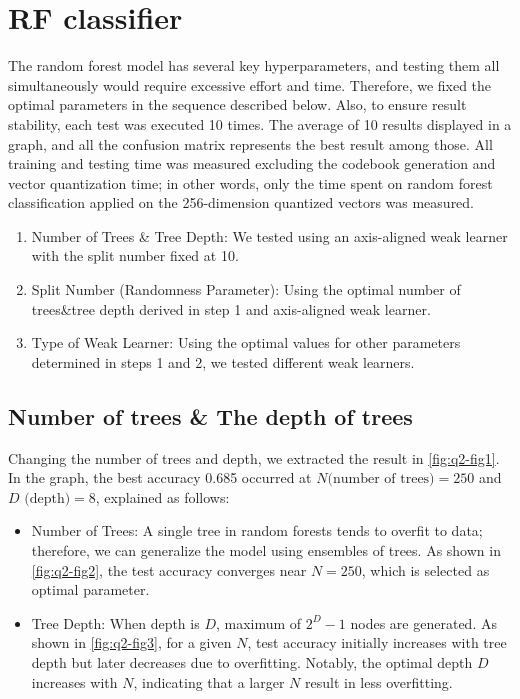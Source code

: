 \section{RF classifier}
\label{sec:intro}

The random forest model has several key hyperparameters, and testing them all simultaneously would require excessive effort and time. Therefore, we fixed the optimal parameters in the sequence described below. Also, to ensure result stability, each test was executed 10 times. The average of 10 results displayed in a graph, and all the confusion matrix represents the best result among those. All training and testing time was measured excluding the codebook generation and vector quantization time; in other words, only the time spent on random forest classification applied on the 256-dimension quantized vectors was measured.
\begin{enumerate}
	\item Number of Trees \& Tree Depth: We tested using an axis-aligned weak learner with the split number fixed at 10.
	\item Split Number (Randomness Parameter): Using the optimal number of trees\&tree depth derived in step 1 and axis-aligned weak learner.
	\item Type of Weak Learner: Using the optimal values for other parameters determined in steps 1 and 2, we tested different weak learners.
\end{enumerate}

\subsection{Number of trees \& The depth of trees}
\label{subsec:Q2_1}
Changing the number of trees and depth, we extracted the result in \cref{fig:q2-fig1}. In the graph, the best accuracy 0.685 occurred at $N \text{(number of trees)} = 250$ and $D\text{ (depth)}=8$, explained as follows:
\begin{itemize}
	\item Number of Trees: A single tree in random forests tends to overfit to data; therefore, we can generalize the model using ensembles of trees. As shown in \cref{fig:q2-fig2}, the test accuracy converges near $N=250$, which is selected as optimal parameter.
	\item Tree Depth: When depth is $D$, maximum of $2^D-1$ nodes are generated. As shown in \cref{fig:q2-fig3}, for a given $N$, test accuracy initially increases with tree depth but later decreases due to overfitting. Notably, the optimal depth $D$ increases with $N$, indicating that a larger $N$ result in less overfitting.
\end{itemize}

